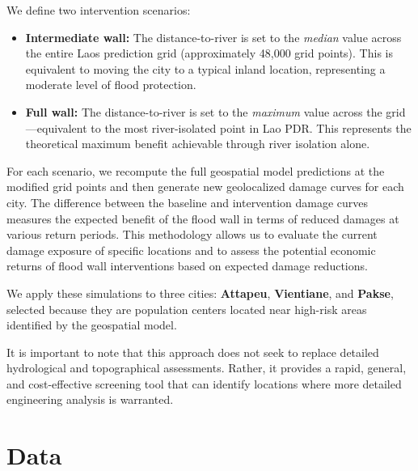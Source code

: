 \documentclass[11pt,a4paper]{article}
\begin{document}
We define two intervention scenarios:

\begin{itemize}[leftmargin=2em]
  \item \textbf{Intermediate wall:} The distance-to-river is set to the \textit{median} value across the entire Laos prediction grid (approximately 48,000 grid points). This is equivalent to moving the city to a typical inland location, representing a moderate level of flood protection.
  \item \textbf{Full wall:} The distance-to-river is set to the \textit{maximum} value across the grid---equivalent to the most river-isolated point in Lao PDR. This represents the theoretical maximum benefit achievable through river isolation alone.
\end{itemize}

For each scenario, we recompute the full geospatial model predictions at the modified grid points and then generate new geolocalized damage curves for each city. The difference between the baseline and intervention damage curves measures the expected benefit of the flood wall in terms of reduced damages at various return periods. This methodology allows us to evaluate the current damage exposure of specific locations and to assess the potential economic returns of flood wall interventions based on expected damage reductions.

We apply these simulations to three cities: \textbf{Attapeu}, \textbf{Vientiane}, and \textbf{Pakse}, selected because they are population centers located near high-risk areas identified by the geospatial model.

It is important to note that this approach does not seek to replace detailed hydrological and topographical assessments. Rather, it provides a rapid, general, and cost-effective screening tool that can identify locations where more detailed engineering analysis is warranted.

\section{Data}
\end{document}
